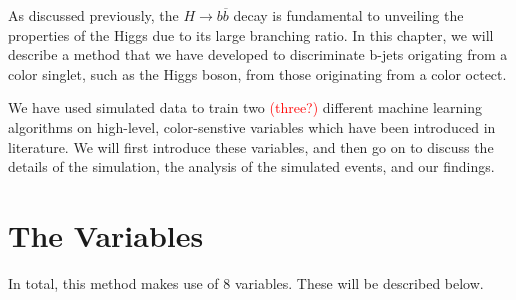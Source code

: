 \documentclass[10pt,a4paper]{book}
\newcommand\todo[1]{\textcolor{red}{#1}}
\begin{document}
As discussed previously, the $H\rightarrow b\overline{b}$ decay is fundamental to unveiling the properties of the Higgs due to its large branching ratio. In this chapter, we will describe a method that we have developed to discriminate b-jets origating from a color singlet, such as the Higgs boson, from those originating from a color octect. 

We have used simulated data to train two \todo{(three?)} different machine learning algorithms on high-level, color-senstive variables which have been introduced in literature. We will first introduce these variables, and then go on to discuss the details of the simulation, the analysis of the simulated events, and our findings.

\section{The Variables}
In total, this method makes use of 8 variables. These will be described below. 
\end{document}
